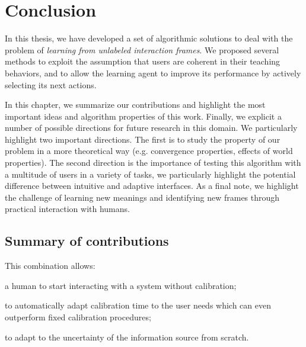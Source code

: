 
\chapter{Conclusion}
\label{chapter:conclusion}
\minitoc

In this thesis, we have developed a set of algorithmic solutions to deal with the problem of \emph{learning from unlabeled interaction frames}. We proposed several methods to exploit the assumption that users are coherent in their teaching behaviors, and to allow the learning agent to improve its performance by actively selecting its next actions.

In this chapter, we summarize our contributions and highlight the most important ideas and algorithm properties of this work. Finally, we explicit a number of possible directions for future research in this domain. We particularly highlight two important directions. The first is to study the property of our problem in a more theoretical way (e.g. convergence properties, effects of world properties). The second direction is the importance of testing this algorithm with a multitude of users in a variety of tasks, we particularly highlight the potential difference between intuitive and adaptive interfaces. As a final note, we highlight the challenge of learning new meanings and identifying new frames through practical interaction with humans.

\section{Summary of contributions}

This combination allows: 
\begin{inparaenum}[a)]
\item a human to start interacting with a system without calibration;
\item to automatically adapt calibration time to the user needs which can even outperform fixed calibration procedures; 
\item to adapt to the uncertainty of the information source from scratch.
\end{inparaenum}

